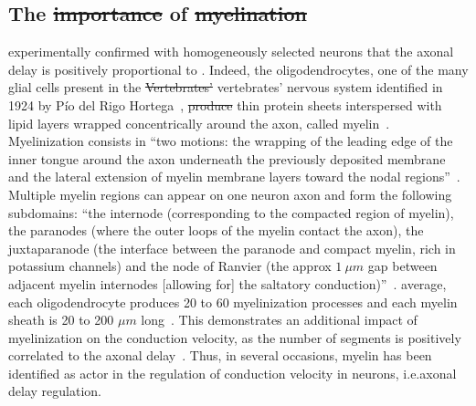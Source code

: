 \documentclass[brainsci, %
               review,accept,pdftex,moreauthors %
               ]{Definitions/mdpi}
\providecommand{\DIFadd}[1]{{\protect\color{blue}\uwave{#1}}} %
\providecommand{\DIFdel}[1]{{\protect\color{red}\sout{#1}}}                      %
\providecommand{\DIFaddbegin}{} %
\providecommand{\DIFaddend}{} %
\providecommand{\DIFdelbegin}{} %
\providecommand{\DIFdelend}{} %
\newcommand{\DIFscaledelfig}{0.5}
\newlength{\DIFdelgraphicswidth} %
\newlength{\DIFdelgraphicsheight} %
\newcommand{\DIFaddincludegraphics}[2][]{{\color{blue}\fbox{\DIFOincludegraphics[#1]{#2}}}} %
\newcommand{\DIFdelincludegraphics}[2][]{%
\sbox{\DIFdelgraphicsbox}{\DIFOincludegraphics[#1]{#2}}%
\settoboxwidth{\DIFdelgraphicswidth}{\DIFdelgraphicsbox} %
\settoboxtotalheight{\DIFdelgraphicsheight}{\DIFdelgraphicsbox} %
\scalebox{\DIFscaledelfig}{%
\parbox[b]{\DIFdelgraphicswidth}{\usebox{\DIFdelgraphicsbox}\\[-\baselineskip] \rule{\DIFdelgraphicswidth}{0em}}\llap{\resizebox{\DIFdelgraphicswidth}{\DIFdelgraphicsheight}{%
\setlength{\unitlength}{\DIFdelgraphicswidth}%
\begin{picture}(1,1)%
\thicklines\linethickness{2pt} %
{\color[rgb]{1,0,0}\put(0,0){\framebox(1,1){}}}%
{\color[rgb]{1,0,0}\put(0,0){\line( 1,1){1}}}%
{\color[rgb]{1,0,0}\put(0,1){\line(1,-1){1}}}%
\end{picture}%
}\hspace*{3pt}}} %
} %
\DeclareRobustCommand{\DIFaddbegin}{\DIFOaddbegin \let\includegraphics\DIFaddincludegraphics} %
\DeclareRobustCommand{\DIFaddend}{\DIFOaddend \let\includegraphics\DIFOincludegraphics} %
\DeclareRobustCommand{\DIFdelbegin}{\DIFOdelbegin \let\includegraphics\DIFdelincludegraphics} %
\DeclareRobustCommand{\DIFdelend}{\DIFOaddend \let\includegraphics\DIFOincludegraphics} %
\begin{document}
\subsection{The \DIFdelbegin \DIFdel{importance }\DIFdelend \DIFaddbegin \DIFadd{Importance }\DIFaddend of \DIFdelbegin \DIFdel{myelination}\DIFdelend \DIFaddbegin \DIFadd{Myelination}\DIFaddend }
\citet{gasser_axon_1939} experimentally confirmed with homogeneously selected neurons that the axonal delay is positively proportional to \DIFdelbegin %
\DIFdelend \DIFaddbegin {}\DIFaddend . Indeed, the oligodendrocytes, one of the many glial cells present in the \DIFdelbegin \DIFdel{Vertebrates' }\DIFdelend vertebrates' nervous system identified in 1924 by Pío del Rigo Hortega~\citep{perez-cerda_pio_2015}, \DIFdelbegin \DIFdel{produce }\DIFdelend \DIFaddbegin \DIFadd{produces }\DIFaddend thin protein sheets interspersed with lipid layers wrapped concentrically around the axon, called myelin~\citep{schmitt_ultrastructure_1939}. Myelinization consists in ``two motions: the wrapping of the leading edge of the inner tongue around the axon underneath the previously deposited membrane and the lateral extension of myelin membrane layers toward the nodal regions''~\citep{simons_oligodendrocytes_2016}. Multiple myelin regions can appear on one neuron axon and form the following subdomains: ``the internode (corresponding to the compacted region of myelin), the paranodes (where the outer loops of the myelin contact the axon), the juxtaparanode (the interface between the paranode and compact myelin, rich in potassium channels) and the node of Ranvier (the approx \DIFdelbegin \DIFdel{$1~\mu m$ }\DIFdelend \DIFaddbegin \DIFadd{$1~\upmu$m }\DIFaddend gap between adjacent myelin internodes [allowing for] the saltatory conduction)''~\citep{duncan_neuron-oligodendrocyte_2021}.  average, each oligodendrocyte produces 20 to 60 myelinization processes and each myelin sheath is 20 to 200 \DIFdelbegin \DIFdel{$\mu m$ }\DIFdelend \DIFaddbegin \DIFadd{$\upmu$m }\DIFaddend long~\citep{simons_oligodendrocytes_2016}. This demonstrates an additional impact of myelinization on the conduction velocity, as the number of segments is positively correlated to the axonal delay~\citep{brill_conduction_1977}. Thus, in several occasions, myelin has been identified as  actor in the regulation of conduction velocity in neurons, i.e.\DIFaddbegin \DIFadd{, }\DIFaddend axonal delay regulation.
\end{document}
